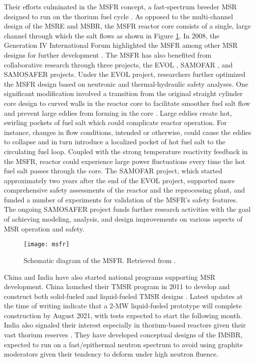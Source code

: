 Their efforts culminated in the \gls{MSFR} concept, a fast-spectrum breeder \gls{MSR}
designed to run on the thorium fuel cycle \cite{merle_optimized_2007}. As opposed to the
multi-channel design of the \gls{MSRE} and \gls{MSBR}, the \gls{MSFR} reactor core consists of a
single, large channel through which the salt flows as shown in Figure \ref{fig:msfr}. In 2008, the
Generation IV International Forum highlighted the \gls{MSFR} among other \gls{MSR} designs for
further development \cite{gif_generation_2008}. The \gls{MSFR} has also benefited from
collaborative research through three projects, the \gls{EVOL} \cite{euratom_final_2015},
\gls{SAMOFAR} \cite{kloosterman_20_2017}, and \gls{SAMOSAFER} \cite{cordis_severe_nodate} projects.
Under the \gls{EVOL} project, researchers further optimized the \gls{MSFR} design based on
neutronic and thermal-hydraulic safety analyses. One significant modification involved a transition
from the original straight cylinder core design to curved walls in the reactor core to facilitate
smoother fuel salt flow and prevent large eddies from forming in the core
\cite{rouch_preliminary_2014}. Large eddies create hot, swirling pockets of fuel salt which could
complicate reactor operation. For instance, changes in flow conditions, intended or otherwise,
could cause the eddies to collapse and in turn introduce a localized pocket of hot fuel salt to the
circulating fuel loop. Coupled with the strong temperature reactivity feedback in the \gls{MSFR},
reactor could experience large power fluctuations every time the hot fuel salt passes through the
core. The \gls{SAMOFAR} project, which started approximately two years after the end of the
\gls{EVOL} project, supported more comprehensive safety assessments of the reactor and the
reprocessing plant, and funded a number of experiments for validation of the \gls{MSFR}'s safety
features. The ongoing \gls{SAMOSAFER} project funds further research activities with the goal of
achieving modeling, analysis, and design improvements on various aspects of \gls{MSR} operation and
safety.
%
\begin{figure}[htb!]
	\centering
	\texttt{[image: msfr]}
	\caption{Schematic diagram of the \gls{MSFR}. Retrieved from 
	\cite{allibert_7_2016}.}
	\label{fig:msfr}
\end{figure}

China and India have also started national programs supporting \gls{MSR}
development. China launched their \gls{TMSR} program in 2011 to develop and
construct both solid-fueled and liquid-fueled \gls{TMSR} designs
\cite{zou_research_2019}. Latest updates at the time of writing indicate that a
2-MW liquid-fueled prototype will complete construction by August
2021, with tests expected to start the following month. India also signaled
their interest especially in thorium-based
reactors given their vast thorium reserves
\cite{jayaram_overview_1987}. They have developed conceptual designs of the
\gls{IMSBR}, expected to run on a fast/epithermal neutron spectrum to avoid
using graphite moderators given their tendency to deform under high neutron
fluence.

